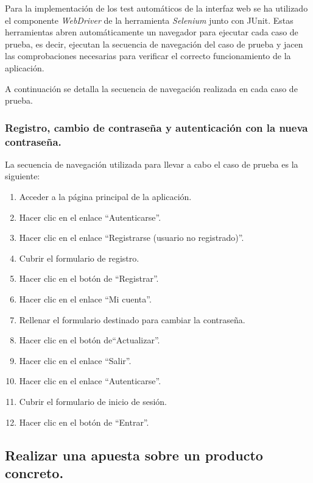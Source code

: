 \documentclass[12pt,a4paper,twoside,spanish]{article}      %
\begin{document}
	Para la implementación de los test automáticos de la interfaz web se ha utilizado el componente \textit{WebDriver} de la herramienta \textit{Selenium} junto con JUnit. Estas herramientas abren automáticamente un navegador para ejecutar cada caso de prueba, es decir, ejecutan la secuencia de navegación del caso de prueba y jacen las comprobaciones necesarias para verificar el correcto funcionamiento de la aplicación.
	
A continuación se detalla la secuencia de navegación realizada en cada caso de prueba.

\subsubsection{Registro, cambio de contraseña y autenticación con la nueva contraseña.}

La secuencia de navegación utilizada para llevar a cabo el caso de prueba es la siguiente:
\begin{enumerate}
	\item Acceder a la página principal de la aplicación.
	\item Hacer clic en el enlace ``Autenticarse''.
	\item Hacer clic en el enlace ``Registrarse (usuario no registrado)''.
	\item Cubrir el formulario de registro.
	\item Hacer clic en el botón de ``Registrar''.
	\item Hacer clic en el enlace ``Mi cuenta''.
	\item Rellenar el formulario destinado para cambiar la contraseña.
	\item Hacer clic en el botón de``Actualizar''.
	\item Hacer clic en el enlace ``Salir''.
	\item Hacer clic en el enlace ``Autenticarse''.
	\item Cubrir el formulario de inicio de sesión.
	\item Hacer clic en el botón de ``Entrar''.	
\end{enumerate}

\subsection{Realizar una apuesta sobre un producto concreto.}
\end{document}
